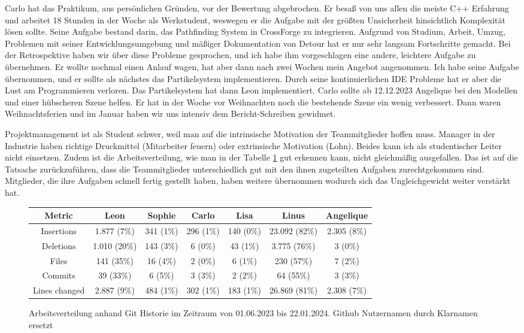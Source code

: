 Carlo hat das Praktikum, aus persönlichen Gründen, vor der Bewertung abgebrochen. Er besaß von uns allen die meiste C++ Erfahrung und arbeitet 18 Stunden in der Woche als Werkstudent, weswegen er die Aufgabe mit der größten Unsicherheit hinsichtlich Komplexität lösen sollte. Seine Aufgabe bestand darin, das Pathfinding System in CrossForge zu integrieren. Aufgrund von Studium, Arbeit, Umzug, Problemen mit seiner Entwicklungsumgebung und mäßiger Dokumentation von Detour hat er nur sehr langsam Fortschritte gemacht.  Bei der Retrospektive haben wir über diese Probleme gesprochen, und ich habe ihm vorgeschlagen eine andere, leichtere Aufgabe zu übernehmen. Er wollte nochmal einen Anlauf wagen, hat aber dann nach zwei Wochen mein Angebot angenommen. Ich habe seine Aufgabe übernommen, und er sollte als nächstes das Partikelsystem implementieren. Durch seine kontinuierlichen IDE Probleme hat er aber die Lust am Programmieren verloren. Das Partikelsystem hat dann Leon implementiert. Carlo sollte ab 12.12.2023 Angelique bei den Modellen und einer hübscheren Szene helfen. Er hat in der Woche vor Weihnachten noch die bestehende Szene ein wenig verbessert. Dann waren Weihnachtsferien und im Januar haben wir uns intensiv dem Bericht-Schreiben gewidmet.

Projektmanagement ist als Student schwer, weil man auf die intrinsische Motivation der Teammitglieder hoffen muss. Manager in der Industrie haben richtige Druckmittel (Mitarbeiter feuern) oder extrinsische Motivation (Lohn). Beides kann ich als studentischer Leiter nicht einsetzen. 
Zudem ist die Arbeitsverteilung, wie man in der Tabelle \ref{arbeitsaufteilung} gut erkennen kann, nicht gleichmäßig ausgefallen. Das ist auf die Tatsache zurückzuführen, dass die Teammitglieder unterschiedlich gut mit den ihnen zugeteilten Aufgaben zurechtgekommen sind. Mitglieder, die ihre Aufgaben schnell fertig gestellt haben, haben weitere übernommen wodurch sich das Ungleichgewicht weiter verstärkt hat.

\begin{figure}[h!]
\begin{tabular}{|c|c|c|c|c|c|c|}
\hline
Metric        & Leon         & Sophie    & Carlo     & Lisa      & Linus         & Angelique \\
\hline
Insertions    & 1.877 (7\%)  & 341 (1\%) & 296 (1\%) & 140 (0\%) & 23.092 (82\%) & 2.305 (8\%) \\
\hline
Deletions     & 1.010 (20\%) & 143 (3\%) & 6 (0\%)   & 43 (1\%)  & 3.775 (76\%)  & 3 (0\%) \\
\hline
Files         & 141 (35\%)   & 16 (4\%)  & 2 (0\%)   & 6 (1\%)   & 230 (57\%)    & 7 (2\%) \\
\hline
Commits       & 39 (33\%)    & 6 (5\%)   & 3 (3\%)   & 2 (2\%)   & 64 (55\%)     & 3 (3\%) \\
\hline
Lines changed & 2.887 (9\%)  & 484 (1\%) & 302 (1\%) & 183 (1\%) & 26.869 (81\%) & 2.308 (7\%) \\
\hline
\end{tabular}
\caption{Arbeitsverteilung anhand Git Historie im Zeitraum von 01.06.2023 bis 22.01.2024. Github Nutzernamen durch Klarnamen ersetzt}
\label{arbeitsaufteilung}
\end{figure}
